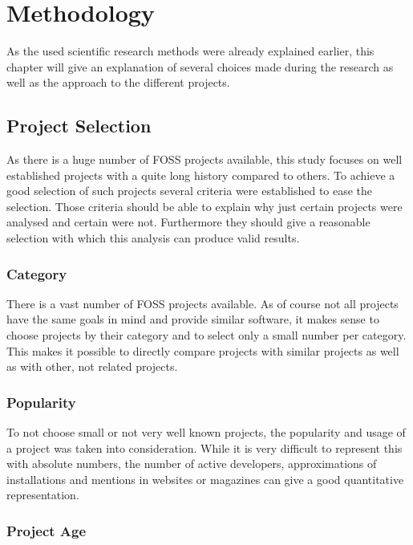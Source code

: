 \chapter{Methodology} %

As the used scientific research methods were already explained earlier, this
chapter will give an explanation of several choices made during the research as
well as the approach to the different projects.

\section{Project Selection} %

As there is a huge number of \ac{FOSS} projects available, this study focuses
on well established projects with a quite long history compared to others. To
achieve a good selection of such projects several criteria were established to
ease the selection. Those criteria should be able to explain why just certain
projects were analysed and certain were not. Furthermore they should give a
reasonable selection with which this analysis can produce valid results.

\subsection{Category} %

There is a vast number of \ac{FOSS} projects available. As of course not all
projects have the same goals in mind and provide similar software, it makes
sense to choose projects by their category and to select only a small number
per category. This makes it possible to directly compare projects with similar
projects as well as with other, not related projects.


\subsection{Popularity} %

To not choose small or not very well known projects, the popularity and usage
of a project was taken into consideration. While it is very difficult to
represent this with absolute numbers, the number of active developers,
approximations of installations and mentions in websites or magazines can give
a good quantitative representation.


\subsection{Project Age} %

